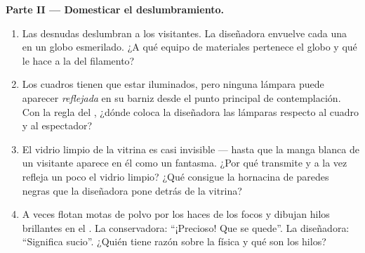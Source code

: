 \begin{problem}
\medskip\noindent\textbf{Parte II --- Domesticar el deslumbramiento.}
\begin{enumerate}[resume]
  \item Las  desnudas deslumbran a los visitantes. La
        diseñadora envuelve cada una en un globo esmerilado. ¿A qué
        equipo de materiales pertenece el globo y qué le hace a la
         del filamento?
  \item Los cuadros tienen que estar iluminados, pero ninguna lámpara
        puede aparecer \emph{reflejada} en su barniz desde el punto
        principal de contemplación. Con la regla del ,
        ¿dónde coloca la diseñadora las lámparas respecto al cuadro y
        al espectador?
  \item El vidrio limpio de la vitrina es casi invisible --- hasta
        que la manga blanca de un visitante aparece en él como un
        fantasma. ¿Por qué transmite y a la vez refleja un poco el
        vidrio limpio? ¿Qué consigue la hornacina de paredes negras
        que la diseñadora pone detrás de la vitrina?
  \item A veces flotan motas de polvo por los haces de los focos y
        dibujan hilos brillantes en el . La conservadora:
        ``¡Precioso! Que se quede''. La diseñadora: ``Significa
         sucio''. ¿Quién tiene razón sobre la física y qué son
        los hilos?
\end{enumerate}


\end{problem}
